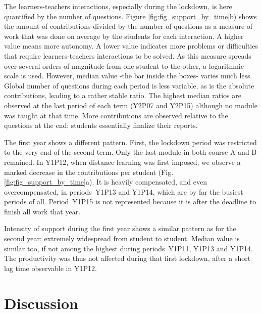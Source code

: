 \documentclass{aims}
\theoremstyle{definition}
\begin{document}
The learners-teachers interactions, especially during the lockdown, is
here quantified by the number of questions. Figure
\ref {fig:fig_support_by_time}b) shows the amount of contributions
divided by the number of questions as a measure of work that was done on
average by the students for each interaction. A higher value means more
autonomy. A lower value indicates more problems or difficulties that
require learners-teachers interactions to be solved. As this measure
spreads over several orders of magnitude from one student to the other,
a logarithmic scale is used. However, median value -the bar inside the
boxes- varies much less. Global number of questions during each period
is less variable, as is the absolute contributions, leading to a rather
stable ratio. The highest median ratios are observed at the last period
of each term (Y2P07 and Y2P15) although no module was taught at that
time. More contributions are observed relative to the questions at the
end: students essentially finalize their reports.

The first year shows a different pattern. First, the lockdown period was
restricted to the very end of the second term. Only the last module in
both course A and B remained. In Y1P12, when distance learning was first
imposed, we observe a marked decrease in the contributions per student
(Fig. \ref {fig:fig_support_by_time}a). It is heavily compensated, and
even overcompensated, in periods~Y1P13 and Y1P14, which are by far the
busiest periods of all. Period~Y1P15 is not represented because it is
after the deadline to finish all work that year.

Intensity of support during the first year shows a similar pattern as
for the second year: extremely widespread from student to student.
Median value is similar too, if not among the highest during
periods~Y1P11, Y1P13 and Y1P14. The productivity was thus not affected
during that first lockdown, after a short lag time observable in Y1P12.

\hypertarget{discussion}{%
\section{Discussion}\label{discussion}}
\end{document}
